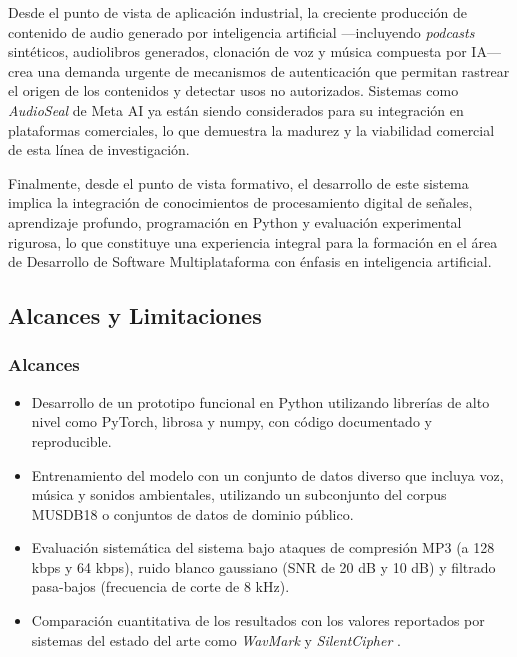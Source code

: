 Desde el punto de vista de aplicación industrial, la creciente producción de contenido de audio generado por inteligencia artificial —incluyendo \textit{podcasts} sintéticos, audiolibros generados, clonación de voz y música compuesta por IA— crea una demanda urgente de mecanismos de autenticación que permitan rastrear el origen de los contenidos y detectar usos no autorizados. Sistemas como \textit{AudioSeal} de Meta AI \cite{sanroman2024audioseal} ya están siendo considerados para su integración en plataformas comerciales, lo que demuestra la madurez y la viabilidad comercial de esta línea de investigación.

Finalmente, desde el punto de vista formativo, el desarrollo de este sistema implica la integración de conocimientos de procesamiento digital de señales, aprendizaje profundo, programación en Python y evaluación experimental rigurosa, lo que constituye una experiencia integral para la formación en el área de Desarrollo de Software Multiplataforma con énfasis en inteligencia artificial.

\subsection{Alcances y Limitaciones}
\label{sec:alcances_limitaciones}

\subsubsection{Alcances}
\label{subsec:alcances}

\begin{itemize}
    \item Desarrollo de un prototipo funcional en Python utilizando librerías de alto nivel como PyTorch, librosa y numpy, con código documentado y reproducible.
    \item Entrenamiento del modelo con un conjunto de datos diverso que incluya voz, música y sonidos ambientales, utilizando un subconjunto del corpus MUSDB18 o conjuntos de datos de dominio público.
    \item Evaluación sistemática del sistema bajo ataques de compresión MP3 (a 128 kbps y 64 kbps), ruido blanco gaussiano (SNR de 20 dB y 10 dB) y filtrado pasa-bajos (frecuencia de corte de 8 kHz).
    \item Comparación cuantitativa de los resultados con los valores reportados por sistemas del estado del arte como \textit{WavMark} \cite{chen2023wavmark} y \textit{SilentCipher} \cite{singh2024silentcipher}.
\end{itemize}

